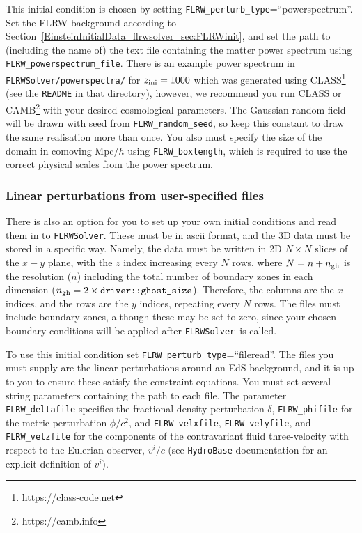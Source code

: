 This initial condition is chosen by setting \texttt{FLRW\_perturb\_type}=``powerspectrum''. Set the FLRW background according to Section~\ref{EinsteinInitialData_flrwsolver_sec:FLRWinit}, and set the path to (including the name of) the text file containing the matter power spectrum using \texttt{FLRW\_powerspectrum\_file}. There is an example power spectrum in \texttt{FLRWSolver/powerspectra/} for $z_{\rm ini}=1000$ which was generated using CLASS\footnote{https://class-code.net} (see the \texttt{README} in that directory), however, we recommend you run CLASS or CAMB\footnote{https://camb.info} with your desired cosmological parameters.
The Gaussian random field will be drawn with seed from \texttt{FLRW\_random\_seed}, so keep this constant to draw the same realisation more than once. You also must specify the size of the domain in comoving Mpc$/h$ using \texttt{FLRW\_boxlength}, which is required to use the correct physical scales from the power spectrum. 




\subsubsection{Linear perturbations from user-specified files}

There is also an option for you to set up your own initial conditions and read them in to \texttt{FLRWSolver}. These must be in ascii format, and the 3D data must be stored in a specific way.
Namely, the data must be written in 2D $N\times N$ slices of the $x-y$ plane, with the $z$ index increasing every $N$ rows, where $N=n+n_{\rm gh}$ is the resolution ($n$) including the total number of boundary zones in each dimension ($n_{\rm gh}=2\times\texttt{driver::ghost\_size}$). Therefore, the columns are the $x$ indices, and the rows are the $y$ indices, repeating every $N$ rows. The files must include boundary zones, although these may be set to zero, since your chosen boundary conditions will be applied after \texttt{FLRWSolver}\ is called.

To use this initial condition set \texttt{FLRW\_perturb\_type}=``fileread''. The files you must supply are the linear perturbations around an EdS background, and it is up to you to ensure these satisfy the constraint equations. You must set several string parameters containing the path to each file. 
The parameter \texttt{FLRW\_deltafile} specifies the fractional density perturbation $\delta$, \texttt{FLRW\_phifile} for the metric perturbation $\phi/c^2$, and \texttt{FLRW\_velxfile}, \texttt{FLRW\_velyfile}, and \texttt{FLRW\_velzfile} for the components of the contravariant fluid three-velocity with respect to the Eulerian observer, $v^i/c$ (see \texttt{HydroBase} documentation for an explicit definition of $v^i$). 



